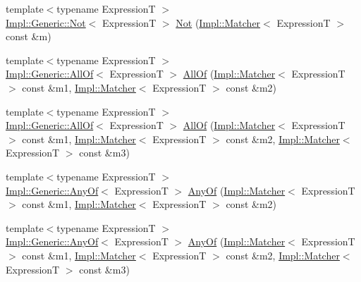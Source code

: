 \begin{DoxyCompactItemize}
\item 
{\footnotesize template$<$typename ExpressionT $>$ }\\\hyperlink{class_catch_1_1_matchers_1_1_impl_1_1_generic_1_1_not}{Impl\+::\+Generic\+::\+Not}$<$ ExpressionT $>$ \hyperlink{namespace_catch_1_1_matchers_ae3c192dc15c973c38f07376d4debdc34}{Not} (\hyperlink{struct_catch_1_1_matchers_1_1_impl_1_1_matcher}{Impl\+::\+Matcher}$<$ ExpressionT $>$ const \&m)
\item 
{\footnotesize template$<$typename ExpressionT $>$ }\\\hyperlink{class_catch_1_1_matchers_1_1_impl_1_1_generic_1_1_all_of}{Impl\+::\+Generic\+::\+All\+Of}$<$ ExpressionT $>$ \hyperlink{namespace_catch_1_1_matchers_aca6c1c17e137d989583c97f99705797a}{All\+Of} (\hyperlink{struct_catch_1_1_matchers_1_1_impl_1_1_matcher}{Impl\+::\+Matcher}$<$ ExpressionT $>$ const \&m1, \hyperlink{struct_catch_1_1_matchers_1_1_impl_1_1_matcher}{Impl\+::\+Matcher}$<$ ExpressionT $>$ const \&m2)
\item 
{\footnotesize template$<$typename ExpressionT $>$ }\\\hyperlink{class_catch_1_1_matchers_1_1_impl_1_1_generic_1_1_all_of}{Impl\+::\+Generic\+::\+All\+Of}$<$ ExpressionT $>$ \hyperlink{namespace_catch_1_1_matchers_a990366f7d62d10d9752ad7b24230def0}{All\+Of} (\hyperlink{struct_catch_1_1_matchers_1_1_impl_1_1_matcher}{Impl\+::\+Matcher}$<$ ExpressionT $>$ const \&m1, \hyperlink{struct_catch_1_1_matchers_1_1_impl_1_1_matcher}{Impl\+::\+Matcher}$<$ ExpressionT $>$ const \&m2, \hyperlink{struct_catch_1_1_matchers_1_1_impl_1_1_matcher}{Impl\+::\+Matcher}$<$ ExpressionT $>$ const \&m3)
\item 
{\footnotesize template$<$typename ExpressionT $>$ }\\\hyperlink{class_catch_1_1_matchers_1_1_impl_1_1_generic_1_1_any_of}{Impl\+::\+Generic\+::\+Any\+Of}$<$ ExpressionT $>$ \hyperlink{namespace_catch_1_1_matchers_a9cb139c71b9e391d5fc017764695bf84}{Any\+Of} (\hyperlink{struct_catch_1_1_matchers_1_1_impl_1_1_matcher}{Impl\+::\+Matcher}$<$ ExpressionT $>$ const \&m1, \hyperlink{struct_catch_1_1_matchers_1_1_impl_1_1_matcher}{Impl\+::\+Matcher}$<$ ExpressionT $>$ const \&m2)
\item 
{\footnotesize template$<$typename ExpressionT $>$ }\\\hyperlink{class_catch_1_1_matchers_1_1_impl_1_1_generic_1_1_any_of}{Impl\+::\+Generic\+::\+Any\+Of}$<$ ExpressionT $>$ \hyperlink{namespace_catch_1_1_matchers_a8efb0e533db973b8aff1172fb908db02}{Any\+Of} (\hyperlink{struct_catch_1_1_matchers_1_1_impl_1_1_matcher}{Impl\+::\+Matcher}$<$ ExpressionT $>$ const \&m1, \hyperlink{struct_catch_1_1_matchers_1_1_impl_1_1_matcher}{Impl\+::\+Matcher}$<$ ExpressionT $>$ const \&m2, \hyperlink{struct_catch_1_1_matchers_1_1_impl_1_1_matcher}{Impl\+::\+Matcher}$<$ ExpressionT $>$ const \&m3)

\end{DoxyCompactItemize}
